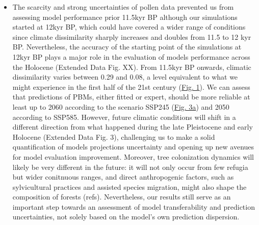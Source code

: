 \documentclass[pdflatex, sn-nature]{sn-jnl}%
\begin{document}
\begin{itemize}
\item The scarcity and strong uncertainties of pollen data prevented us from assessing model performance prior 11.5kyr BP although our simulations started at 12kyr BP, which could have covered a wider range of conditions since climate dissimilarity sharply increases and doubles from 11.5 to 12 kyr BP. Nevertheless, the accuracy of the starting point of the simulations at 12kyr BP plays a major role in the evaluation of models performance across the Holocene (Extended Data Fig. XX).  From 11.5kyr BP onwards, climatic dissimilarity varies between 0.29 and 0.08, a level equivalent to what we might experience in the first half of the 21st century (\hyperref[climatic_dissimilarity]{Fig. 1}). We can assess that predictions of PBMs, either fitted or expert, should be more reliable at least up to 2060 according to the scenario SSP245 (\hyperref[past_performance]{Fig. 3a}) and 2050 according to SSP585. However, future climatic conditions will shift in a different direction from what happened during the late Pleistocene and early Holocene (Extended Data Fig. 3), challenging us to make a solid quantification of models projections uncertainty and opening up new avenues for model evaluation improvement. Moreover, tree colonization dynamics will likely be very different in the future: it will not only occur from few refugia but wider conitnuous ranges, and direct anthropogenic factors, such as sylvicultural practices and assisted species migration, might also shape the composition of forests (refs). Nevertheless, our results still serve as an important step towards an assessment of model transferability and prediction uncertainties, not solely based on the model's own prediction dispersion. 


\end{itemize}
\end{document}

